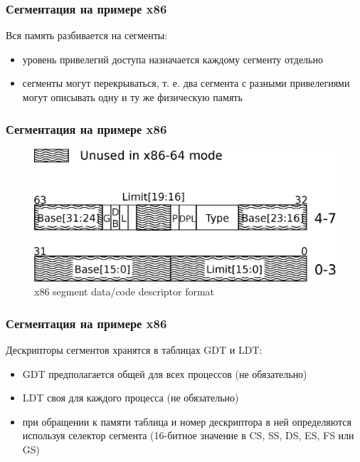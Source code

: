 \begin{frame}
\frametitle{Сегментация на примере x86}

Вся память разбивается на сегменты:
\begin{itemize}
  \item уровень привелегий доступа назначается каждому сегменту отдельно
  \item сегменты могут перекрываться, т. е. два сегмента с разными привелегиями могут описывать одну и ту же физическую память
\end{itemize}

\end{frame}

\begin{frame}
\frametitle{Сегментация на примере x86}

\begin{figure}
\centering\includegraphics[width=.9\linewidth]{arch-segd}
\caption{x86 segment data/code descriptor format}
\end{figure}

\end{frame}

\begin{frame}
\frametitle{Сегментация на примере x86}

Дескрипторы сегментов хранятся в таблицах GDT и LDT:
\begin{itemize}
  \item GDT предполагается общей для всех процессов (не обязательно)
  \item LDT своя для каждого процесса (не обязательно)
  \item при обращении к памяти таблица и номер дескриптора в ней определяются используя селектор сегмента (16-битное значение в CS, SS, DS, ES, FS или GS)
\end{itemize}
\end{frame}


